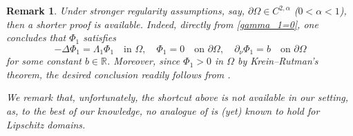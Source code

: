 \documentclass[a4paper,11pt]{article}
\newtheorem{remark}[theorem]{Remark}
\numberwithin{equation}{section}
\begin{document}
\begin{remark}
Under stronger regularity assumptions, say, $\partial\Omega\in C^{2,\alpha}$ ($0<\alpha<1$), then a shorter proof is available. Indeed, directly from \eqref{gamma_1=0}, one concludes that $\Phi_1$ satisfies
\begin{equation*}
   -\Delta\Phi_1=\Lambda_1\Phi_1\quad \text{in }\Omega, \quad \Phi_1=0\quad \text{on } \partial\Omega, \quad \partial_\nu \Phi_1=b\quad \text{on }\partial\Omega 
\end{equation*}
for some constant $b\in\mathbb{R}$. Moreover, since $\Phi_1>0$ in $\Omega$ by Krein--Rutman's theorem, the desired conclusion readily follows from \cite[Theorem 2]{serrin1971}.

We remark that, unfortunately, the shortcut above is not available in our setting, as, to the best of our knowledge, no analogue of \cite[Theorem 2]{serrin1971} is (yet) known to hold for Lipschitz domains. 
\end{remark}
\newpage
\end{document}
